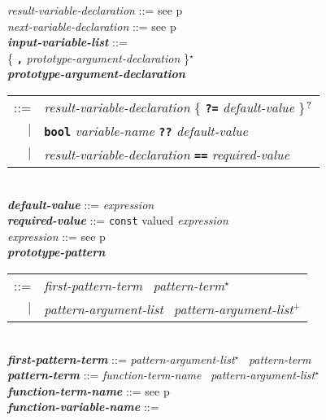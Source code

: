 \documentclass[12pt]{article}
\newcommand{\TT}[1]{{\tt \bfseries #1}}
\newcommand{\STAR}{{\Large $^\star$}}
\newcommand{\PLUS}[1][]{{$^{+#1}$}}
\newcommand{\QMARK}{{$^{\,\mbox{\footnotesize ?}}$}}
\newcommand{\emkey}[1]{{\em \bfseries #1}}
\newcommand{\pagref}[1]{p\pageref{#1}}
\newenvironment{indpar}[1][0.3in]%
	{\begin{list}{}%
		     {\setlength{\itemsep}{0in}%
		      \setlength{\topsep}{0in}%
		      \setlength{\parsep}{1ex}%
		      \setlength{\labelwidth}{#1}%
		      \setlength{\leftmargin}{#1}%
		      \addtolength{\leftmargin}{\labelsep}}%
	 \item}%
	{\end{list}}
\begin{document}
\begin{indpar}[0.1in]
{\em result-variable-declaration} ::= see \pagref{RESULT-VARIABLE-DECLARATION}
\\[0.5ex]
{\em next-variable-declaration} ::= see \pagref{NEXT-VARIABLE-DECLARATION}
\\[0.5ex]
\emkey{input-variable-list} ::= \\
\hspace*{0.5in}{\em prototype-argument-declaration}
                 \{ \TT{,} {\em prototype-argument-declaration} \}\STAR{}
\\[0.5ex]
\emkey{prototype-argument-declaration}\label{PROTOTYPE-ARGUMENT-DECLARATION} \\
\hspace*{0.5in}\begin{tabular}[t]{@{}rl@{}}
    ::= & {\em result-variable-declaration}
          \{ \TT{?=} {\em default-value} \}\QMARK{} \\
    $|$ & \TT{bool} {\em variable-name}
          \TT{??} {\em default-value} \\
    $|$ & {\em result-variable-declaration}
          \TT{==} {\em required-value} \\
    \end{tabular}
\\[0.5ex]
\emkey{default-value} ::= {\em expression}
\\[0.5ex]
\emkey{required-value} ::= {\tt const} valued {\em expression}
\\[0.5ex]
{\em expression} ::= see \pagref{EXPRESSION}
\\[0.5ex]
\emkey{prototype-pattern}\label{PROTOTYPE-PATTERN}
    \begin{tabular}[t]{rl}
    ::= & {\em first-pattern-term}~ {\em pattern-term}\STAR{} \\
    $|$ & {\em pattern-argument-list}~ {\em pattern-argument-list}\PLUS{}
    \end{tabular}
\\[0.5ex]
\emkey{first-pattern-term} ::= {\em pattern-argument-list}\STAR{}~
				{\em pattern-term}
\\[0.5ex]
\emkey{pattern-term}
    ::= {\em function-term-name}~ {\em pattern-argument-list}\STAR{}
\\[0.5ex]
\emkey{function-term-name} ::= see \pagref{FUNCTION-TERM-NAME}
\\[0.5ex]
\emkey{function-variable-name}\label{FUNCTION-VARIABLE-NAME} ::= \\
\hspace*{0.5in}
    \begin{tabular}[t]{@{}p{5in}@{}}

\end{tabular}
\end{indpar}
\end{document}
